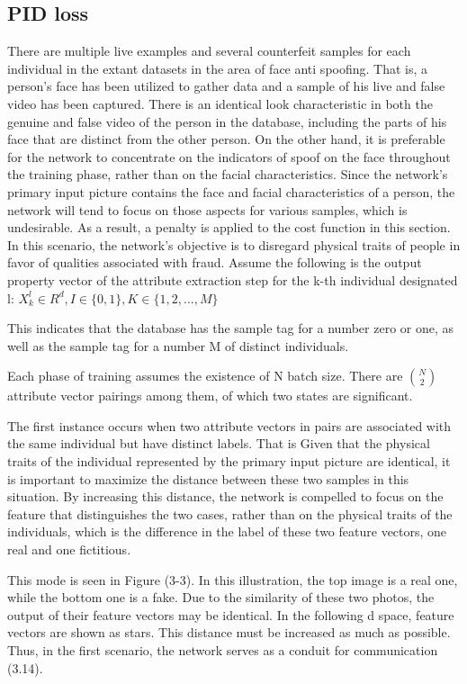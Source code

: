 \documentclass[journal]{IEEEtran}
\begin{document}
\subsection{PID loss}

There are multiple live examples and several counterfeit samples for each individual in the extant datasets in the area of face anti spoofing. That is, a person's face has been utilized to gather data and a sample of his live and false video has been captured. There is an identical look characteristic in both the genuine and false video of the person in the database, including the parts of his face that are distinct from the other person. On the other hand, it is preferable for the network to concentrate on the indicators of spoof on the face throughout the training phase, rather than on the facial characteristics.
Since the network's primary input picture contains the face and facial characteristics of a person, the network will tend to focus on those aspects for various samples, which is undesirable.
As a result, a penalty is applied to the cost function in this section. In this scenario, the network's objective is to disregard physical traits of people in favor of qualities associated with fraud.
Assume the following is the output property vector of the attribute extraction step for the k-th individual designated l:
$X_k^l \in R^d , I \in \{0,1\}, K \in \{1,2,...,M\}$

This indicates that the database has the sample tag for a number zero or one, as well as the sample tag for a number M of distinct individuals.

Each phase of training assumes the existence of N batch size. There are ${N\choose 2}$ attribute vector pairings among them, of which two states are significant.

The first instance occurs when two attribute vectors in pairs are associated with the same individual but have distinct labels. That is Given that the physical traits of the individual represented by the primary input picture are identical, it is important to maximize the distance between these two samples in this situation. By increasing this distance, the network is compelled to focus on the feature that distinguishes the two cases, rather than on the physical traits of the individuals, which is the difference in the label of these two feature vectors, one real and one fictitious.

This mode is seen in Figure (3-3). In this illustration, the top image is a real one, while the bottom one is a fake. Due to the similarity of these two photos, the output of their feature vectors may be identical. In the following d space, feature vectors are shown as stars. This distance must be increased as much as possible. Thus, in the first scenario, the network serves as a conduit for communication (3.14).
\end{document}
